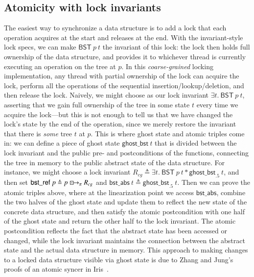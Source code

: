 \documentclass[runningheads]{llncs}
\newcommand{\islock}{\boxdotright}
\newcommand{\treerep}{\ensuremath{\mathsf{bst\_abs}}}
\newcommand{\nodeboxrep}{\ensuremath{\mathsf{bst\_ref}}}
\begin{document}
\subsection{Atomicity with lock invariants}
The easiest way to synchronize a data structure is to add a lock that each operation acquires at the start and releases at the end. With the invariant-style lock specs, we can make $\mathsf{BST}\ p\ t$ the invariant of this lock: the lock then holds full ownership of the data structure, and provides it to whichever thread is currently executing an operation on the tree at $p$.
In this \emph{coarse-grained} locking implementation, any thread with partial ownership of the lock can acquire the lock, perform all the operations of the sequential insertion/lookup/deletion, and then release the lock. Naively, we might choose as our lock invariant $\exists t.\ \mathsf{BST}\ p\ t$, asserting that we gain full ownership of the tree in some state $t$ every time we acquire the lock---but this is not enough to tell us that we have changed the lock's state by the end of the operation, since we merely restore the invariant that there is \emph{some} tree $t$ at $p$. This is where ghost state and atomic triples come in: we can define a piece of ghost state $\mathsf{ghost\_bst}\ t$ that is divided between the lock invariant and the public pre- and postconditions of the functions, connecting the tree in memory to the public abstract state of the data structure. For instance, we might choose a lock invariant $R_{\mathit{cg}} \triangleq \exists t.\ \mathsf{BST}\ p\ t * \mathsf{ghost\_bst}_{.5}\ t$, and then set $\nodeboxrep\ p \triangleq p \islock_\pi R_{\mathit{cg}}$ and $\treerep\ t \triangleq \mathsf{ghost\_bst}_{.5}\ t$. %
Then we can prove the atomic triples above, where at the linearization point we access $\treerep$, combine the two halves of the ghost state and update them to reflect the new state of the concrete data structure, and then satisfy the atomic postcondition with one half of the ghost state and return the other half to the lock invariant. The atomic postcondition reflects the fact that the abstract state has been accessed or changed, while the lock invariant maintains the connection between the abstract state and the actual data structure in memory. This approach to making changes to a locked data structure visible via ghost state is due to Zhang and Jung's proofs of an atomic syncer in Iris~\cite{atomic-syncer}.%
\end{document}
